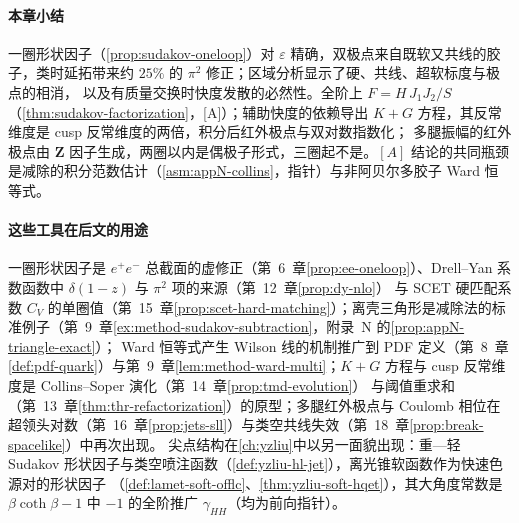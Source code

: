 \paragraph{本章小结}一圈形状因子（\cref{prop:sudakov-oneloop}）对 $\varepsilon$ 精确，双极点来自既软又共线的胶子，类时延拓带来约 $25\%$ 的 $\pi^2$ 修正；区域分析显示了硬、共线、超软标度与极点的相消，
以及有质量交换时快度发散的必然性。全阶上 $F=H\,J_1J_2/S$（\cref{thm:sudakov-factorization}，[A]）；辅助快度的依赖导出 $K+G$ 方程，其反常维度是 cusp 反常维度的两倍，积分后红外极点与双对数指数化；
多腿振幅的红外极点由 $\mathbf Z$ 因子生成，两圈以内是偶极子形式，三圈起不是。$[A]$ 结论的共同瓶颈是减除的积分范数估计（\cref{asm:appN-collins}，指针）与非阿贝尔多胶子 Ward 恒等式。

\paragraph{这些工具在后文的用途}一圈形状因子是 $e^+e^-$ 总截面的虚修正（第~6~章\cref{prop:ee-oneloop}）、Drell--Yan 系数函数中 $\delta(1-z)$ 与 $\pi^2$ 项的来源（第~12~章\cref{prop:dy-nlo}）
与 SCET 硬匹配系数 $C_V$ 的单圈值（第~15~章\cref{prop:scet-hard-matching}）；离壳三角形是减除法的标准例子（第~9~章\cref{ex:method-sudakov-subtraction}，附录~N 的\cref{prop:appN-triangle-exact}）；
Ward 恒等式产生 Wilson 线的机制推广到 PDF 定义（第~8~章\cref{def:pdf-quark}）与第~9~章\cref{lem:method-ward-multi}；$K+G$ 方程与 cusp 反常维度是 Collins--Soper 演化（第~14~章\cref{prop:tmd-evolution}）
与阈值重求和（第~13~章\cref{thm:thr-refactorization}）的原型；多腿红外极点与 Coulomb 相位在超领头对数（第~16~章\cref{prop:jets-sll}）与类空共线失效（第~18~章\cref{prop:break-spacelike}）中再次出现。
尖点结构在\cref{ch:yzliu}中以另一面貌出现：重—轻 Sudakov 形状因子与类空喷注函数（\cref{def:yzliu-hl-jet}），离光锥软函数作为快速色源对的形状因子
（\cref{def:lamet-soft-offlc}、\cref{thm:yzliu-soft-hqet}），其大角度常数是 $\beta\coth\beta-1$ 中 $-1$ 的全阶推广 $\gamma_{HH}$（均为前向指针）。
